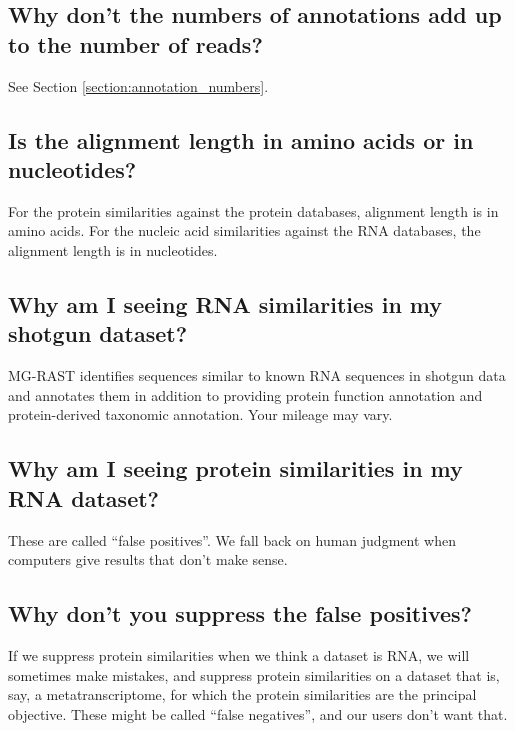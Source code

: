 \documentclass[12pt,fullpage]{report}
\begin{document}
\subsection{Why don't the numbers of annotations add up to the number of reads?}
See Section \ref{section:annotation_numbers}.
\subsection{Is the alignment length in amino acids or in nucleotides?}
For the protein similarities against the protein databases, alignment length is in amino acids.  For the nucleic acid similarities against the RNA databases, the alignment length is in nucleotides.
\subsection{Why am I seeing RNA similarities in my shotgun dataset?}
MG-RAST identifies sequences similar to known RNA sequences in shotgun data and annotates them in addition to providing protein function annotation and protein-derived taxonomic annotation.  Your mileage may vary.
\subsection{Why am I seeing protein similarities in my RNA dataset?}
These are called ``false positives''.   We fall back on human judgment when computers give results that don't make sense.
\subsection{Why don't you suppress the false positives?}
If we suppress protein similarities when we think a dataset is RNA, we will sometimes make mistakes, and suppress protein similarities on a dataset that is, say, a metatranscriptome, for which the protein similarities are the principal objective.   These might be called ``false negatives'', and our users don't want that.
\end{document}

